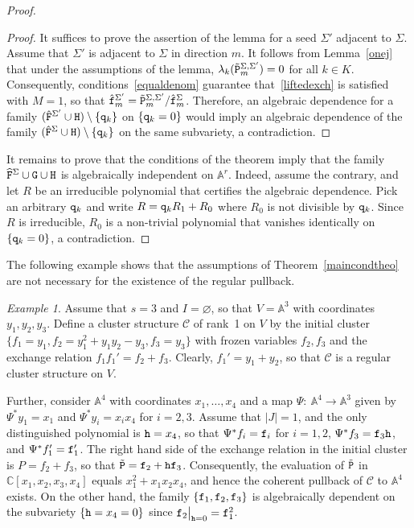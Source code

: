 \documentclass{amsart}
\theoremstyle{definition}
\theoremstyle{remark}
\newtheorem{example}[theorem]{Example}
\numberwithin{equation}{section}
\numberwithin{theorem}{section}
\def\AA{{\mathbb A}}
\def\C{{\mathbb C}}
\def\CC{{\mathcal C}}
\def\ttf{{\tt f}}
\def\tth{{\tt h}}
\def\ttq{{\tt q}}
\def\ttF{{\tt F}}
\def\ttG{{\tt G}}
\def\ttH{{\tt H}}
\def\ttP{{\tt P}}
\def\:{{:\ }}
\begin{document}
\begin{proof}
\begin{proof} It suffices to prove the assertion of the lemma for a seed $\Sigma'$ adjacent to $\Sigma$. 
Assume that $\Sigma'$ is adjacent to $\Sigma$ in  direction $m$.
It follows from Lemma~\ref{onej} %
that under the assumptions of the lemma,
 $\lambda_k(\tilde \ttP_m^{\Sigma,\Sigma'})=0$ 
for all $k\in K$. %
Consequently, conditions~\eqref{equaldenom} guarantee that~\eqref{liftedexch} is satisfied with $M=1$, so that 
$\hat\ttf_m^{\Sigma'}=\tilde\ttP_m^{\Sigma,\Sigma'}/\hat\ttf_m^\Sigma$. Therefore, an algebraic dependence for a family
$(\hat\ttF^{\Sigma'}\cup\ttH)\setminus\{\ttq_{k}\}$
on $\{\ttq_{k}=0\}$ would imply an algebraic dependence of the family 
$(\hat\ttF^\Sigma\cup\ttH)\setminus\{\ttq_{k}\}$
on the same subvariety, a contradiction.
\end{proof}

It remains to prove that the conditions of the theorem imply that the family $\widehat\ttF^\Sigma\cup\ttG\cup\ttH$ is algebraically independent on $\AA^r$. Indeed, assume the contrary, and let $R$ be an irreducible polynomial that certifies the algebraic dependence. Pick an arbitrary $\ttq_k$ and write $R=\ttq_kR_1+R_0$  where $R_0$ is not divisible by $\ttq_k$. Since $R$ is irreducible, $R_0$ is a non-trivial polynomial that vanishes identically on $\{\ttq_k=0\}$, a contradiction. 
\end{proof}

The following example shows that the assumptions of Theorem~\ref{maincondtheo} are not necessary for the existence of the regular pullback.

\begin{example}\label{regdepend}
Assume that $s=3$ and $I=\varnothing$, so that $V=\AA^3$ with coordinates $y_1, y_2, y_3$. 
Define a cluster structure $\CC$ of rank~1 on $V$ 
by the initial cluster $\{f_1=y_1, f_2=y_1^2+y_1y_2-y_3, f_3=y_3\}$ with frozen variables $f_2, f_3$ and  the 
exchange relation $f_1f_1'=f_2+f_3$. Clearly, $f_1'=y_1+y_2$, so that $\CC$ is a regular cluster structure on $V$.

Further, consider $\AA^4$ with coordinates $x_1,\dots,x_4$ and a map $\Psi\:\AA^4\to\AA^3$ given by
$\Psi^*y_1=x_1$ and $\Psi^*y_i=x_ix_4$ for $i=2,3$. Assume that $|J|=1$, and the only distinguished polynomial is 
$\tth=x_4$, so that $\Psi^*f_i=\ttf_i$ for $i=1,2$, $\Psi^*f_3=\ttf_3\tth$, and $\Psi^*f_1'=\ttf_1'$. 
The right hand side of the exchange relation in the initial cluster is $P=f_2+f_3$, so that 
$\tilde{\ttP}=\ttf_2+\tth\ttf_3$. Consequently, the evaluation of $\tilde\ttP$ in $\C[x_1,x_2,x_3,x_4]$ 
equals $x_1^2+x_1x_2x_4$, and hence the coherent pullback of $\CC$ to $\AA^4$ exists. On the other hand, 
the family $\{\ttf_1, \ttf_2, \ttf_3\}$ is algebraically dependent on the
subvariety $\{\tth=x_4=0\}$ since $\ttf_2\bigr\rvert_{\tth=0}=\ttf_1^2$.  
\end{example} 
\end{document}
